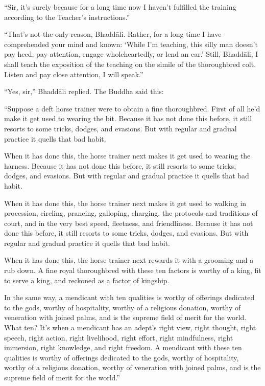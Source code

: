\documentclass[12pt,openany]{book}%
\begin{document}
“Sir, it’s surely because for a long time now I haven’t fulfilled the training according to the Teacher’s instructions.” 

“That’s not the only reason, \textsanskrit{Bhaddāli}. Rather, for a long time I have comprehended your mind and known: ‘While I’m teaching, this silly man doesn’t pay heed, pay attention, engage wholeheartedly, or lend an ear.’ Still, \textsanskrit{Bhaddāli}, I shall teach the exposition of the teaching on the simile of the thoroughbred colt. Listen and pay close attention, I will speak.” 

“Yes, sir,” \textsanskrit{Bhaddāli} replied. The Buddha said this: 

“Suppose a deft horse trainer were to obtain a fine thoroughbred. First of all he’d make it get used to wearing the bit. Because it has not done this before, it still resorts to some tricks, dodges, and evasions. But with regular and gradual practice it quells that bad habit. 

When it has done this, the horse trainer next makes it get used to wearing the harness. Because it has not done this before, it still resorts to some tricks, dodges, and evasions. But with regular and gradual practice it quells that bad habit. 

When it has done this, the horse trainer next makes it get used to walking in procession, circling, prancing, galloping, charging, the protocols and traditions of court, and in the very best speed, fleetness, and friendliness. Because it has not done this before, it still resorts to some tricks, dodges, and evasions. But with regular and gradual practice it quells that bad habit. 

When it has done this, the horse trainer next rewards it with a grooming and a rub down. A fine royal thoroughbred with these ten factors is worthy of a king, fit to serve a king, and reckoned as a factor of kingship. 

In the same way, a mendicant with ten qualities is worthy of offerings dedicated to the gods, worthy of hospitality, worthy of a religious donation, worthy of veneration with joined palms, and is the supreme field of merit for the world. What ten? It’s when a mendicant has an adept’s right view, right thought, right speech, right action, right livelihood, right effort, right mindfulness, right immersion, right knowledge, and right freedom. A mendicant with these ten qualities is worthy of offerings dedicated to the gods, worthy of hospitality, worthy of a religious donation, worthy of veneration with joined palms, and is the supreme field of merit for the world.” 
\end{document}
